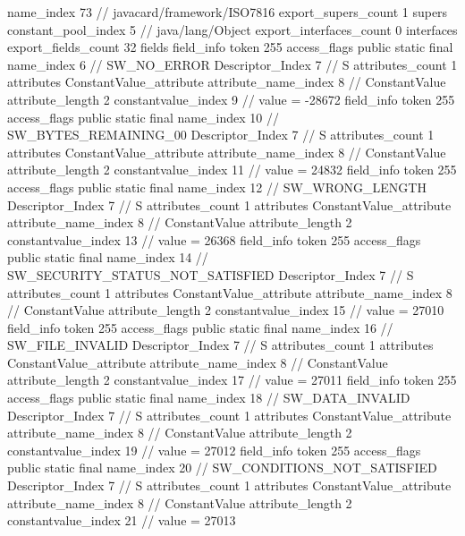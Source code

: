 {{{			name_index	73		// javacard/framework/ISO7816
			export_supers_count	1
			supers {
				constant_pool_index	5		// java/lang/Object
			}
			export_interfaces_count	0
			interfaces {
			}
			export_fields_count	32
			fields {
			field_info {
				token	255
				access_flags	public static final
				name_index	6		// SW_NO_ERROR
				Descriptor_Index	7		// S
				attributes_count	1
				attributes {
				ConstantValue_attribute {
					attribute_name_index	8		// ConstantValue
					attribute_length	2
					constantvalue_index	9		// value = -28672
				}
				}
			}
			field_info {
				token	255
				access_flags	public static final
				name_index	10		// SW_BYTES_REMAINING_00
				Descriptor_Index	7		// S
				attributes_count	1
				attributes {
				ConstantValue_attribute {
					attribute_name_index	8		// ConstantValue
					attribute_length	2
					constantvalue_index	11		// value = 24832
				}
				}
			}
			field_info {
				token	255
				access_flags	public static final
				name_index	12		// SW_WRONG_LENGTH
				Descriptor_Index	7		// S
				attributes_count	1
				attributes {
				ConstantValue_attribute {
					attribute_name_index	8		// ConstantValue
					attribute_length	2
					constantvalue_index	13		// value = 26368
				}
				}
			}
			field_info {
				token	255
				access_flags	public static final
				name_index	14		// SW_SECURITY_STATUS_NOT_SATISFIED
				Descriptor_Index	7		// S
				attributes_count	1
				attributes {
				ConstantValue_attribute {
					attribute_name_index	8		// ConstantValue
					attribute_length	2
					constantvalue_index	15		// value = 27010
				}
				}
			}
			field_info {
				token	255
				access_flags	public static final
				name_index	16		// SW_FILE_INVALID
				Descriptor_Index	7		// S
				attributes_count	1
				attributes {
				ConstantValue_attribute {
					attribute_name_index	8		// ConstantValue
					attribute_length	2
					constantvalue_index	17		// value = 27011
				}
				}
			}
			field_info {
				token	255
				access_flags	public static final
				name_index	18		// SW_DATA_INVALID
				Descriptor_Index	7		// S
				attributes_count	1
				attributes {
				ConstantValue_attribute {
					attribute_name_index	8		// ConstantValue
					attribute_length	2
					constantvalue_index	19		// value = 27012
				}
				}
			}
			field_info {
				token	255
				access_flags	public static final
				name_index	20		// SW_CONDITIONS_NOT_SATISFIED
				Descriptor_Index	7		// S
				attributes_count	1
				attributes {
				ConstantValue_attribute {
					attribute_name_index	8		// ConstantValue
					attribute_length	2
					constantvalue_index	21		// value = 27013
				}
}}}}}}
